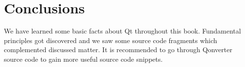 \chapter{Conclusions}
We have learned some basic facts about Qt throughout this book. Fundamental principles got discovered and we saw some source code fragments which complemented discussed matter. It is recommended to go through Qonverter source code to gain more useful source code snippets.